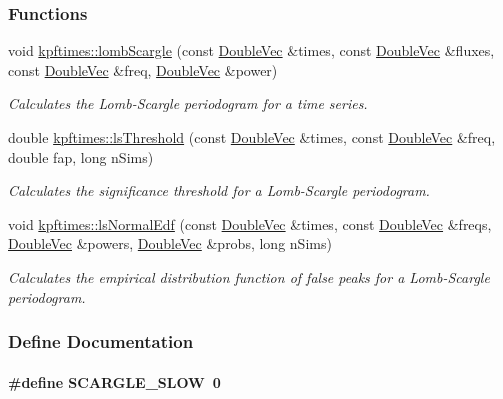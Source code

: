 \subsubsection*{Functions}
\begin{DoxyCompactItemize}
\item 
void \hyperlink{group__period_ga2c64d467f67fa7f90f96617275e057a7}{kpftimes::lombScargle} (const \hyperlink{dft_8h_ae5d5553d1db3abe03c161a5ffd0bf9ad}{DoubleVec} \&times, const \hyperlink{dft_8h_ae5d5553d1db3abe03c161a5ffd0bf9ad}{DoubleVec} \&fluxes, const \hyperlink{dft_8h_ae5d5553d1db3abe03c161a5ffd0bf9ad}{DoubleVec} \&freq, \hyperlink{dft_8h_ae5d5553d1db3abe03c161a5ffd0bf9ad}{DoubleVec} \&power)
\begin{DoxyCompactList}\small\item\em Calculates the Lomb-\/Scargle periodogram for a time series. \end{DoxyCompactList}\item 
double \hyperlink{group__period_ga86b0f84540eab7eb0793b5ba94899d1e}{kpftimes::lsThreshold} (const \hyperlink{dft_8h_ae5d5553d1db3abe03c161a5ffd0bf9ad}{DoubleVec} \&times, const \hyperlink{dft_8h_ae5d5553d1db3abe03c161a5ffd0bf9ad}{DoubleVec} \&freq, double fap, long nSims)
\begin{DoxyCompactList}\small\item\em Calculates the significance threshold for a Lomb-\/Scargle periodogram. \end{DoxyCompactList}\item 
void \hyperlink{group__period_gab3a488d98ed28a6723689f09b5d984fb}{kpftimes::lsNormalEdf} (const \hyperlink{dft_8h_ae5d5553d1db3abe03c161a5ffd0bf9ad}{DoubleVec} \&times, const \hyperlink{dft_8h_ae5d5553d1db3abe03c161a5ffd0bf9ad}{DoubleVec} \&freqs, \hyperlink{dft_8h_ae5d5553d1db3abe03c161a5ffd0bf9ad}{DoubleVec} \&powers, \hyperlink{dft_8h_ae5d5553d1db3abe03c161a5ffd0bf9ad}{DoubleVec} \&probs, long nSims)
\begin{DoxyCompactList}\small\item\em Calculates the empirical distribution function of false peaks for a Lomb-\/Scargle periodogram. \end{DoxyCompactList}\end{DoxyCompactItemize}


\subsubsection{Define Documentation}
\hypertarget{group__period_gae1f03252f094cf8180186c55a9fa635d}{
\paragraph[{SCARGLE\_\-SLOW}]{\setlength{\rightskip}{0pt plus 5cm}\#define SCARGLE\_\-SLOW~0}}
\label{group__period_gae1f03252f094cf8180186c55a9fa635d}


